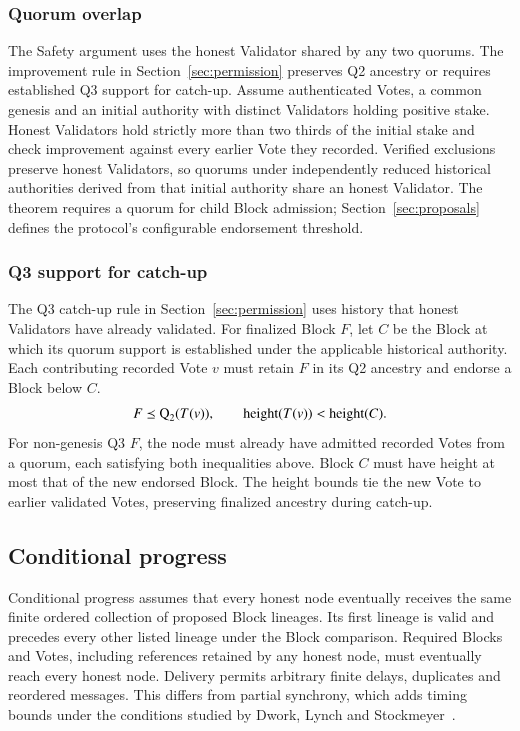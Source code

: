 \subsubsection{Quorum overlap}\label{sec:safety-quorums}

The Safety argument uses the honest Validator shared by any two quorums.
The improvement rule in Section~\ref{sec:permission} preserves Q2 ancestry or requires established Q3 support for catch-up.
Assume authenticated Votes, a common genesis and an initial authority with distinct Validators holding positive stake.
Honest Validators hold strictly more than two thirds of the initial stake and check improvement against every earlier Vote they recorded.
Verified exclusions preserve honest Validators, so quorums under independently reduced historical authorities derived from that initial authority share an honest Validator.
The theorem requires a quorum for child Block admission; Section~\ref{sec:proposals} defines the protocol's configurable endorsement threshold.

\subsubsection{Q3 support for catch-up}\label{sec:q3-support}

The Q3 catch-up rule in Section~\ref{sec:permission} uses history that honest Validators have already validated.
For finalized Block $F$, let $C$ be the Block at which its quorum support is established under the applicable historical authority.
Each contributing recorded Vote $v$ must retain $F$ in its Q2 ancestry and endorse a Block below $C$.
\[
F\preceq\operatorname{Q}_{2}(T(v)),\qquad
\operatorname{height}(T(v))<\operatorname{height}(C).
\]
For non-genesis Q3 $F$, the node must already have admitted recorded Votes from a quorum, each satisfying both inequalities above.
Block $C$ must have height at most that of the new endorsed Block.
The height bounds tie the new Vote to earlier validated Votes, preserving finalized ancestry during catch-up.

\subsection{Conditional progress}\label{sec:liveness}

Conditional progress assumes that every honest node eventually receives the same finite ordered collection of proposed Block lineages.
Its first lineage is valid and precedes every other listed lineage under the Block comparison.
Required Blocks and Votes, including references retained by any honest node, must eventually reach every honest node.
Delivery permits arbitrary finite delays, duplicates and reordered messages.
This differs from partial synchrony, which adds timing bounds under the conditions studied by Dwork, Lynch and Stockmeyer~\citep{rw-dls}.

